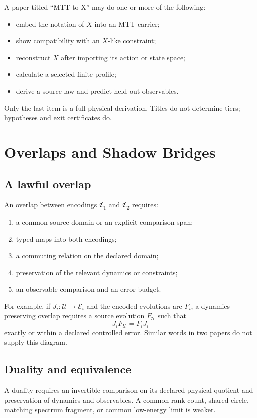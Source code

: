 \documentclass[11pt]{article}
\begin{document}
A paper titled ``MTT to X'' may do one or more of the following:
\begin{itemize}
\item embed the notation of $X$ into an MTT carrier;
\item show compatibility with an $X$-like constraint;
\item reconstruct $X$ after importing its action or state space;
\item calculate a selected finite profile;
\item derive a source law and predict held-out observables.
\end{itemize}
Only the last item is a full physical derivation.  Titles do not determine
tiers; hypotheses and exit certificates do.

\section{Overlaps and Shadow Bridges}

\subsection{A lawful overlap}

An overlap between encodings $\mathfrak C_1$ and $\mathfrak C_2$ requires:
\begin{enumerate}[label=\arabic*.]
\item a common source domain or an explicit comparison span;
\item typed maps into both encodings;
\item a commuting relation on the declared domain;
\item preservation of the relevant dynamics or constraints;
\item an observable comparison and an error budget.
\end{enumerate}

For example, if $J_i:\mathcal U\to\mathcal E_i$ and the encoded evolutions are
$F_i$, a dynamics-preserving overlap requires a source evolution $F_{\mathcal
U}$ such that
\[
J_iF_{\mathcal U}=F_iJ_i
\]
exactly or within a declared controlled error.  Similar words in two papers
do not supply this diagram.

\subsection{Duality and equivalence}

A duality requires an invertible comparison on its declared physical quotient
and preservation of dynamics and observables.  A common rank count, shared
circle, matching spectrum fragment, or common low-energy limit is weaker.
\end{document}
